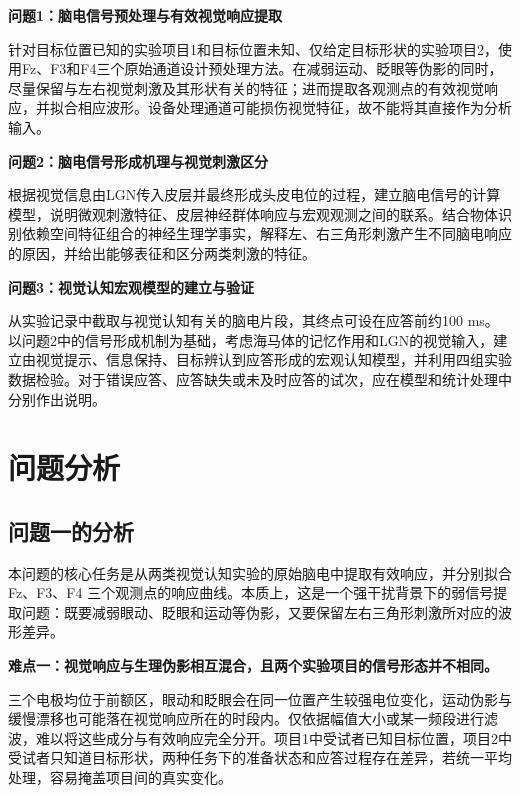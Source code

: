 \documentclass[a4paper]{ctexart}
\numberwithin{figure}{section}       %
\begin{document}
\noindent\textbf{问题1：脑电信号预处理与有效视觉响应提取}

针对目标位置已知的实验项目1和目标位置未知、仅给定目标形状的实验项目2，使用Fz、F3和F4三个原始通道设计预处理方法。在减弱运动、眨眼等伪影的同时，尽量保留与左右视觉刺激及其形状有关的特征；进而提取各观测点的有效视觉响应，并拟合相应波形。设备处理通道可能损伤视觉特征，故不能将其直接作为分析输入。

\noindent\textbf{问题2：脑电信号形成机理与视觉刺激区分}

根据视觉信息由LGN传入皮层并最终形成头皮电位的过程，建立脑电信号的计算模型，说明微观刺激特征、皮层神经群体响应与宏观观测之间的联系。结合物体识别依赖空间特征组合的神经生理学事实，解释左、右三角形刺激产生不同脑电响应的原因，并给出能够表征和区分两类刺激的特征。

\noindent\textbf{问题3：视觉认知宏观模型的建立与验证}

从实验记录中截取与视觉认知有关的脑电片段，其终点可设在应答前约100 ms。以问题2中的信号形成机制为基础，考虑海马体的记忆作用和LGN的视觉输入，建立由视觉提示、信息保持、目标辨认到应答形成的宏观认知模型，并利用四组实验数据检验。对于错误应答、应答缺失或未及时应答的试次，应在模型和统计处理中分别作出说明。
\newpage


\section{问题分析}

\subsection{问题一的分析}

本问题的核心任务是从两类视觉认知实验的原始脑电中提取有效响应，并分别拟合 Fz、F3、F4 三个观测点的响应曲线。本质上，这是一个强干扰背景下的弱信号提取问题：既要减弱眼动、眨眼和运动等伪影，又要保留左右三角形刺激所对应的波形差异。

\noindent\textbf{难点一：视觉响应与生理伪影相互混合，且两个实验项目的信号形态并不相同。}

三个电极均位于前额区，眼动和眨眼会在同一位置产生较强电位变化，运动伪影与缓慢漂移也可能落在视觉响应所在的时段内。仅依据幅值大小或某一频段进行滤波，难以将这些成分与有效响应完全分开。项目1中受试者已知目标位置，项目2中受试者只知道目标形状，两种任务下的准备状态和应答过程存在差异，若统一平均处理，容易掩盖项目间的真实变化。
\end{document}
